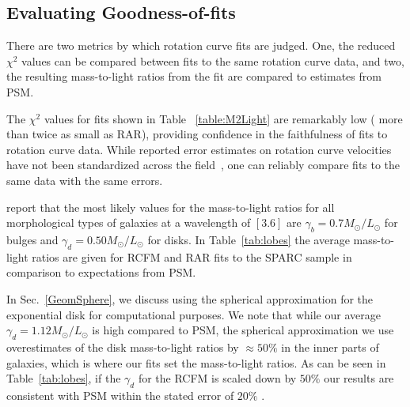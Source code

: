 \documentclass[reprint,%
 amsmath,amssymb,
 aps,
]{revtex4-1}
\begin{document}
\subsection{Evaluating Goodness-of-fits}

There are two metrics by which rotation curve fits are judged. One, the reduced  $\chi^2$ values can be compared between fits to the same rotation curve data, and 
 two, the resulting mass-to-light ratios from the fit are compared to estimates from PSM. 

The $\chi^{2}$ values for fits shown in Table ~\ref{table:M2Light} are remarkably low ({\color{blue} more than twice as small as RAR}), providing confidence in the faithfulness of fits to rotation curve data.  
  While reported error    estimates on rotation curve velocities  have not been standardized across the field~\citep{Blok,Gent},     one can reliably   compare fits to the same data with the same  errors. 

 \citet{McGaugh2016RAR} report that  the most likely values for the mass-to-light ratios for all morphological types of galaxies at a wavelength of  $[3.6]$ are
    $\gamma_{b} = 0.7 M_\odot/L_\odot$ for bulges  
    and $\gamma_{d}= 0.50 M_\odot/L_\odot$ for disks.   
   In Table~\ref{tab:lobes}  the    average mass-to-light ratios are given for RCFM and RAR fits to the  SPARC sample in comparison to expectations from PSM. 
    
  
  In Sec.~\ref{GeomSphere}, we discuss using the spherical approximation for the exponential disk for computational purposes. We note that while our average $\gamma_{d}= 1.12 M_\odot/L_\odot$ is high compared to PSM, the spherical approximation we use
   overestimates of the disk mass-to-light ratios   by $\approx 50\%$ in the inner parts of galaxies, which is where our fits set the mass-to-light ratios. As can be seen in Table~\ref{tab:lobes}, if the $\gamma_d$ for the RCFM is scaled down by $ 50\%$ our results are consistent with PSM within the stated error of $ 20\%$ \cite{2016Lelli}.  
  
    
    
\end{document}
